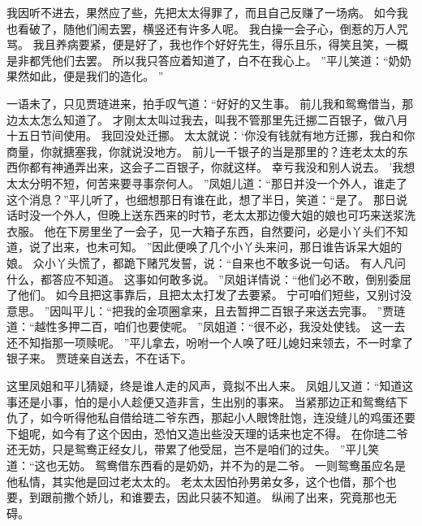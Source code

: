我因听不进去，果然应了些，先把太太得罪了，而且自己反赚了一场病。
如今我也看破了，随他们闹去罢，横竖还有许多人呢。
我白操一会子心，倒惹的万人咒骂。
我且养病要紧，便是好了，我也作个好好先生，得乐且乐，得笑且笑，一概是非都凭他们去罢。
所以我只答应着知道了，白不在我心上。
”平儿笑道：“奶奶果然如此，便是我们的造化。
”\par
一语未了，只见贾琏进来，拍手叹气道：“好好的又生事。
前儿我和鸳鸯借当，那边太太怎么知道了。
才刚太太叫过我去，叫我不管那里先迁挪二百银子，做八月十五日节间使用。
我回没处迁挪。
太太就说：‘你没有钱就有地方迁挪，我白和你商量，你就搪塞我，你就说没地方。
前儿一千银子的当是那里的？连老太太的东西你都有神通弄出来，这会子二百银子，你就这样。
幸亏我没和别人说去。
’我想太太分明不短，何苦来要寻事奈何人。
”凤姐儿道：“那日并没一个外人，谁走了这个消息？”平儿听了，也细想那日有谁在此，想了半日，笑道：“是了。
那日说话时没一个外人，但晚上送东西来的时节，老太太那边傻大姐的娘也可巧来送浆洗衣服。
他在下房里坐了一会子，见一大箱子东西，自然要问，必是小丫头们不知道，说了出来，也未可知。
”因此便唤了几个小丫头来问，那日谁告诉呆大姐的娘。
众小丫头慌了，都跪下赌咒发誓，说：“自来也不敢多说一句话。
有人凡问什么，都答应不知道。
这事如何敢多说。
”凤姐详情说：“他们必不敢，倒别委屈了他们。
如今且把这事靠后，且把太太打发了去要紧。
宁可咱们短些，又别讨没意思。
”因叫平儿：“把我的金项圈拿来，且去暂押二百银子来送去完事。
”贾琏道：“越性多押二百，咱们也要使呢。
”凤姐道：“很不必，我没处使钱。
这一去还不知指那一项赎呢。
”平儿拿去，吩咐一个人唤了旺儿媳妇来领去，不一时拿了银子来。
贾琏亲自送去，不在话下。
\par
这里凤姐和平儿猜疑，终是谁人走的风声，竟拟不出人来。
凤姐儿又道：“知道这事还是小事，怕的是小人趁便又造非言，生出别的事来。
当紧那边正和鸳鸯结下仇了，如今听得他私自借给琏二爷东西，那起小人眼馋肚饱，连没缝儿的鸡蛋还要下蛆呢，如今有了这个因由，恐怕又造出些没天理的话来也定不得。
在你琏二爷还无妨，只是鸳鸯正经女儿，带累了他受屈，岂不是咱们的过失。
”平儿笑道：“这也无妨。
鸳鸯借东西看的是奶奶，并不为的是二爷。
一则鸳鸯虽应名是他私情，其实他是回过老太太的。
老太太因怕孙男弟女多，这个也借，那个也要，到跟前撒个娇儿，和谁要去，因此只装不知道。
纵闹了出来，究竟那也无碍。
